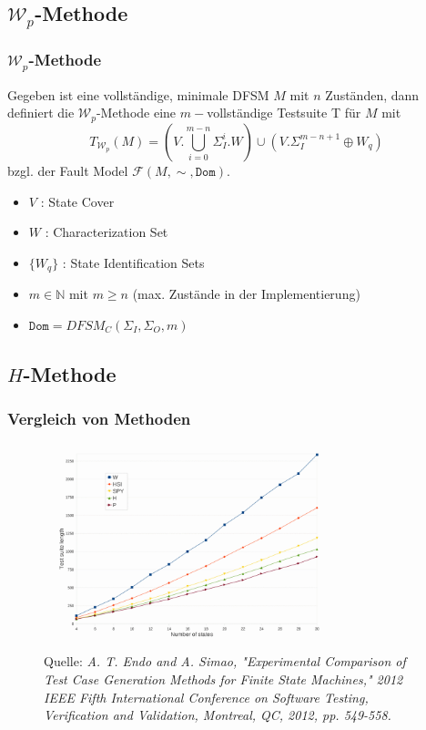 \documentclass[10pt]{beamer}
\newcommand{\W}{\mathcal{W}}
\newcommand{\F}{\mathcal{F}}
\begin{document}
\subsection{$\W_p$-Methode}
\begin{frame}
  \frametitle{$\W_p$-Methode}
  \begin{definition}[$\W_p$-Methode]
  Gegeben ist eine vollständige, minimale DFSM $M$ mit $n$ Zuständen, dann definiert die $\W_p$-Methode eine $m-$vollständige Testsuite T für $M$ mit
  $$T_{\W_p}(M) = (V.\bigcup\limits_{i=0}^{m-n}\Sigma_I^i.W) \cup (V.\Sigma_I^{m-n+1} \oplus {W_q}) $$
  bzgl. der Fault Model $\F(M, \sim, \texttt{Dom})$.
  \end{definition}
  \begin{itemize}
    \item $V$ : State Cover
    \item $W$ : Characterization Set
    \item $\{W_q\}$ : State Identification Sets
    \item $m \in \mathbb{N}$ mit $m \geq n$ (max. Zustände in der Implementierung)
    \item $\texttt{Dom} = DFSM_C(\Sigma_I, \Sigma_O, m)$ 
  \end{itemize}

\end{frame}


\subsection{$H$-Methode}
\begin{frame}
  \frametitle{Vergleich von Methoden}
  \begin{figure}
	  \caption{Quelle: \emph{A. T. Endo and A. Simao, "Experimental Comparison of Test Case Generation Methods for Finite State Machines," 2012 IEEE Fifth International Conference on Software Testing, Verification and Validation, Montreal, QC, 2012, pp. 549-558.} }
	  \centering
	  \includegraphics[width=0.85\textwidth]{images/methodComparison}
	\end{figure}

\end{frame}
\end{document}

